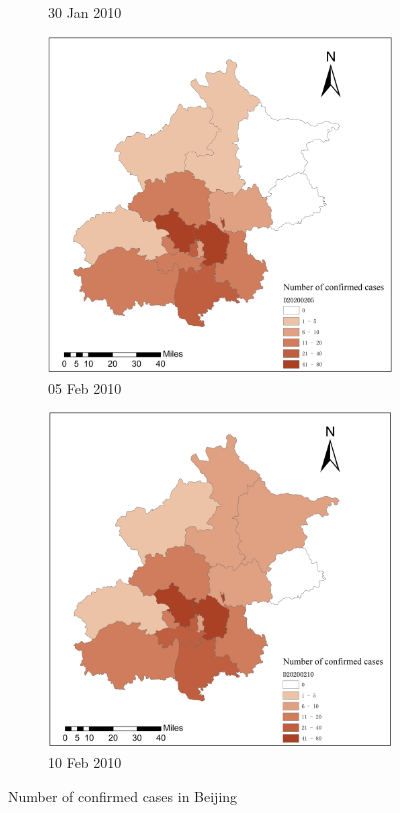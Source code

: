 \documentclass[preprints,ijgi,submit,moreauthors]{Definitions/mdpi}
\begin{document}
\begin{figure}[H]
\begin{subfigure}{.2\textwidth}
        \caption{30 Jan 2010}
    \end{subfigure}
    \begin{subfigure}{.2\textwidth}
        \includegraphics[width=\textwidth]{Figures/Plot_location_confirmed_cases(district)0205.png}
        \caption{05 Feb 2010}
    \end{subfigure}
    \begin{subfigure}{.2\textwidth}
        \includegraphics[width=\textwidth]{Figures/Plot_location_confirmed_cases(district)0210.png}
        \caption{10 Feb 2010}
    \end{subfigure}
    \centering
    \caption{Number of confirmed cases in Beijing}
    \label{fig:number of confirmed cases}
\end{figure}
\end{document}
